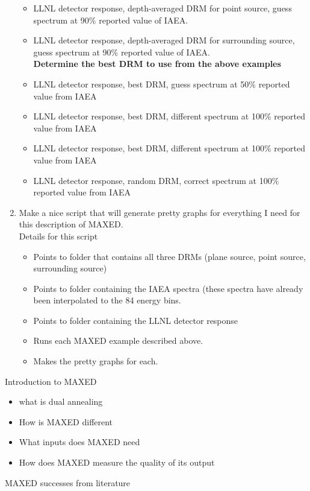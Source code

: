 \documentclass[11pt]{article}
\begin{document}
\begin{enumerate}
\begin{itemize}
	\item LLNL detector response, depth-averaged DRM for point source, guess spectrum at 90\% reported value of IAEA.
	\item LLNL detector response, depth-averaged DRM for surrounding source, guess spectrum at 90\% reported value of IAEA.\\
	\textbf{Determine the best DRM to use from the above examples}
	\item LLNL detector response, best DRM, guess spectrum at 50\% reported value from IAEA
	\item LLNL detector response, best DRM, different spectrum at 100\% reported value from IAEA
	\item LLNL detector response, best DRM, different spectrum at 100\% reported value from IAEA
	\item LLNL detector response, random DRM, correct spectrum at 100\% reported value from IAEA
	
	\end{itemize}
\item Make a nice script that will generate pretty graphs for everything I need for this description of MAXED.\\
Details for this script
	\begin{itemize}
	\item Points to folder that contains all three DRMs (plane source, point source, surrounding source)
	\item Points to folder containing the IAEA spectra (these spectra have already been interpolated to the 84 energy bins.
	\item Points to folder containing the LLNL detector response
	\item Runs each MAXED example described above.
	\item Makes the pretty graphs for each.
	\end{itemize}

\end{enumerate}
\break


Introduction to MAXED
\begin{itemize}
   \item what is dual annealing
   \item How is MAXED different
   \item What inputs does MAXED need
   \item How does MAXED measure the quality of its output
\end{itemize}

MAXED successes from literature\\
\end{document}
